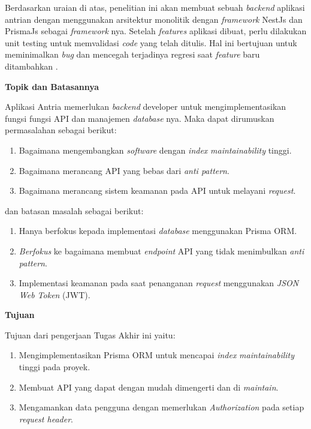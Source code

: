 Berdasarkan uraian di atas, penelitian ini akan membuat sebuah \textit{backend} aplikasi antrian dengan menggunakan arsitektur monolitik dengan \textit{framework} NestJs dan PrismaJs sebagai \textit{framework} nya. Setelah \textit{features} aplikasi dibuat, perlu dilakukan unit testing untuk memvalidasi \textit{code} yang telah ditulis. Hal ini bertujuan untuk meminimalkan \textit{bug} dan mencegah terjadinya regresi saat \textit{feature} baru ditambahkan \cite{runeson2006survey}.

\noindent\textbf{Topik dan Batasannya}

Aplikasi Antria memerlukan \textit{backend} developer untuk mengimplementasikan fungsi fungsi API dan manajemen \textit{database} nya. Maka dapat dirumuskan permasalahan sebagai berikut:
\begin{enumerate}
  \item Bagaimana mengembangkan \textit{software} dengan \textit{index} \textit{maintainability} tinggi.
  \item Bagaimana merancang API yang bebas dari \textit{anti pattern}.
  \item Bagaimana merancang sistem keamanan pada API untuk melayani \textit{request}.
\end{enumerate}
dan batasan masalah sebagai berikut:
\begin{enumerate}
  \item Hanya berfokus kepada implementasi \textit{database} menggunakan Prisma ORM.
  \item \textit{Berfokus} ke bagaimana membuat \textit{endpoint} API yang tidak menimbulkan \textit{anti pattern}.
  \item Implementasi keamanan pada saat penanganan \textit{request} menggunakan \textit{JSON Web Token} (JWT).
\end{enumerate}


\noindent\textbf{Tujuan}

Tujuan dari pengerjaan Tugas Akhir ini yaitu:
\begin{enumerate}
  \item Mengimplementasikan Prisma ORM untuk mencapai \textit{index} \textit{maintainability} tinggi pada proyek.
  \item Membuat API yang dapat dengan mudah dimengerti dan di \textit{maintain}.
  \item Mengamankan data pengguna dengan memerlukan \textit{Authorization} pada setiap \textit{request header}.
  
\end{enumerate}


